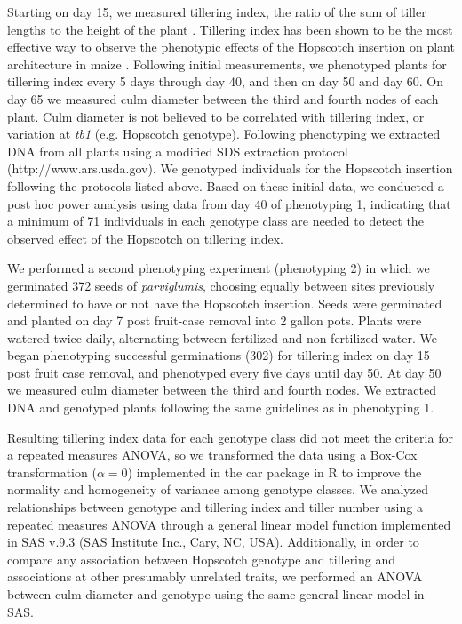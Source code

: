 \documentclass[12pt]{article}
\begin{document}
Starting on day 15, we measured tillering index, the ratio of the sum of tiller lengths to the height of the plant \cite{Briggs et al 2007}. Tillering index has been shown to be the most effective way to observe the phenotypic effects of the Hopscotch insertion on plant architecture in maize \cite{Briggs et al 2007}. Following initial measurements, we phenotyped plants for tillering index every 5 days through day 40, and then on day 50 and day 60. On day 65 we measured culm diameter between the third and fourth nodes of each plant. Culm diameter is not believed to be correlated with tillering index, or variation at \emph{tb1} (e.g. Hopscotch genotype). Following phenotyping we extracted DNA from all plants using a modified SDS extraction protocol (http://www.ars.usda.gov). We genotyped individuals for the Hopscotch insertion following the protocols listed above. Based on these initial data, we conducted a post hoc power analysis using data from day 40 of phenotyping 1, indicating that a minimum of 71 individuals in each genotype class are needed to detect the observed effect of the Hopscotch on tillering index.

We performed a second phenotyping experiment (phenotyping 2) in which we germinated 372 seeds of \emph{parviglumis}, choosing equally between sites previously determined to have or not have the Hopscotch insertion. Seeds were germinated and planted on day 7 post fruit-case removal into 2 gallon pots. Plants were watered twice daily, alternating between fertilized and non-fertilized water. We began phenotyping successful germinations (302) for tillering index on day 15 post fruit case removal, and phenotyped every five days until day 50. At day 50 we measured culm diameter between the third and fourth nodes. We extracted DNA and genotyped plants following the same guidelines as in phenotyping 1. 

Resulting tillering index data for each genotype class did not meet the criteria for a repeated measures ANOVA, so we transformed the data using a Box-Cox transformation ($\alpha=0$) implemented in the car package in R \cite{Fox and Weisberg 2011} to improve the normality and homogeneity of variance among genotype classes.  We analyzed relationships between genotype and tillering index and tiller number using a repeated measures ANOVA through a general linear model function implemented in SAS v.9.3 (SAS Institute Inc., Cary, NC, USA). Additionally, in order to compare any association between Hopscotch genotype and tillering and associations at other presumably unrelated traits, we performed an ANOVA between culm diameter and genotype using the same general linear model in SAS. 
\end{document}
